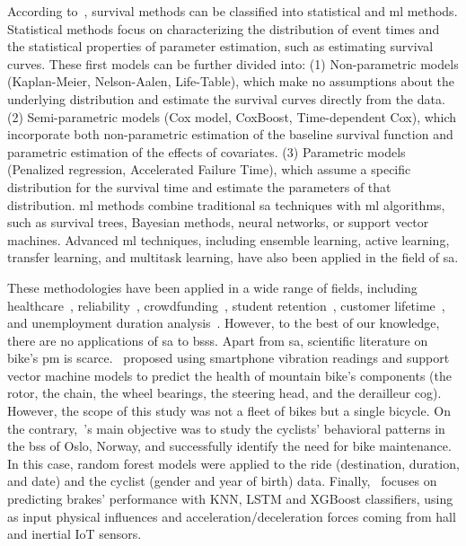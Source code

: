 According to~\cite{Wang2019_ml_review}, survival methods can be classified into statistical and \ac{ml} methods. Statistical methods focus on characterizing the distribution of event times and the statistical properties of parameter estimation, such as estimating survival curves. These first models can be further divided into: (1) Non-parametric models (Kaplan-Meier, Nelson-Aalen, Life-Table), which make no assumptions about the underlying distribution and estimate the survival curves directly from the data. (2) Semi-parametric models (Cox model, CoxBoost, Time-dependent Cox), which incorporate both non-parametric estimation of the baseline survival function and parametric estimation of the effects of covariates. (3) Parametric models (Penalized regression, Accelerated Failure Time), which assume a specific distribution for the survival time and estimate the parameters of that distribution. \ac{ml} methods combine traditional \ac{sa} techniques with \ac{ml} algorithms, such as survival trees, Bayesian methods, neural networks, or support vector machines. Advanced \ac{ml} techniques, including ensemble learning, active learning, transfer learning, and multitask learning, have also been applied in the field of \ac{sa}.

These methodologies have been applied in a wide range of fields, including healthcare~\cite{Reddy2015}, reliability~\cite{Modarres2016}, crowdfunding~\cite{Li2016}, student retention~\cite{Ameri2016}, customer lifetime~\cite{Furrer2022}, and unemployment duration analysis~\cite{Kiefer1988}. However, to the best of our knowledge, there are no applications of \ac{sa} to \acp{bss}. Apart from \ac{sa}, scientific literature on bike's \ac{pm} is scarce.~\cite{MountainBike2019} proposed using smartphone vibration readings and support vector machine models to predict the health of mountain bike's components (the rotor, the chain, the wheel bearings, the steering head, and the derailleur cog). However, the scope of this study was not a fleet of bikes but a single bicycle. On the contrary,~\cite{Predictivemaintenancebike2018}'s main objective was to study the cyclists' behavioral patterns in the \ac{bss} of Oslo, Norway, and successfully identify the need for bike maintenance. In this case, random forest models were applied to the ride (destination, duration, and date) and the cyclist (gender and year of birth) data. Finally,~\cite{Matkovic2021} focuses on predicting brakes' performance with KNN, LSTM and XGBoost classifiers, using as input physical influences and acceleration/deceleration forces coming from hall and inertial IoT sensors.